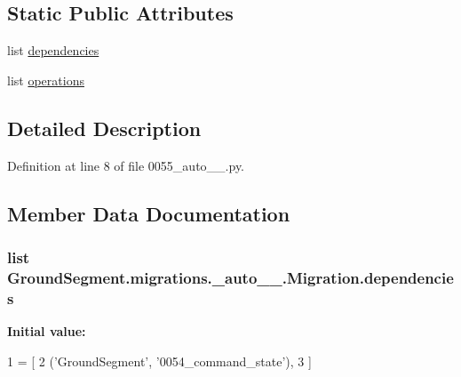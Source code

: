 \subsection*{Static Public Attributes}
\begin{DoxyCompactItemize}
\item 
list \hyperlink{class_ground_segment_1_1migrations_1_10055__auto__20170327__1403_1_1_migration_a58a1e0c7365bc0e319d16a4c1990f3f8}{dependencies}
\item 
list \hyperlink{class_ground_segment_1_1migrations_1_10055__auto__20170327__1403_1_1_migration_a38b2cb6f693b60c560e46e6b1a955fc4}{operations}
\end{DoxyCompactItemize}


\subsection{Detailed Description}


Definition at line 8 of file 0055\+\_\+auto\+\_\+\_.\+py.



\subsection{Member Data Documentation}
\hypertarget{class_ground_segment_1_1migrations_1_10055__auto__20170327__1403_1_1_migration_a58a1e0c7365bc0e319d16a4c1990f3f8}{}
\subsubsection[{dependencies}]{\setlength{\rightskip}{0pt plus 5cm}list Ground\+Segment.\+migrations.\+\_\+auto\+\_\+\_.\+Migration.\+dependencies\hspace{0.3cm}{\ttfamily [static]}}\label{class_ground_segment_1_1migrations_1_10055__auto__20170327__1403_1_1_migration_a58a1e0c7365bc0e319d16a4c1990f3f8}
{\bfseries Initial value\+:}
\begin{DoxyCode}
1 = [
2         (\textcolor{stringliteral}{'GroundSegment'}, \textcolor{stringliteral}{'0054\_command\_state'}),
3     ]
\end{DoxyCode}


